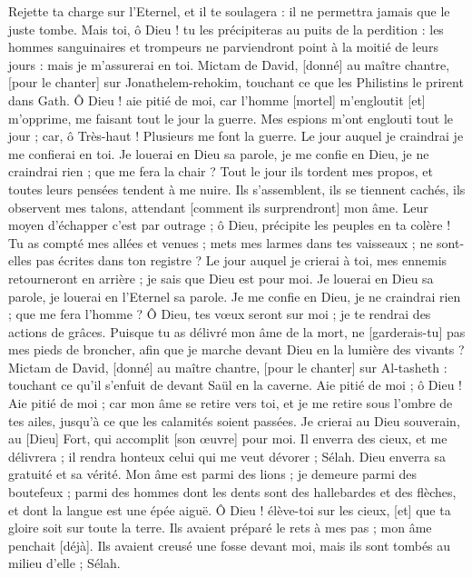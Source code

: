 \begin{multicols}{2}
Rejette ta charge sur l'Eternel, et il te soulagera : il ne permettra jamais que le juste tombe.
Mais toi, ô Dieu ! tu les précipiteras au puits de la perdition : les hommes sanguinaires et trompeurs ne parviendront point à la moitié de leurs jours : mais je m'assurerai en toi.
\VerseOne{}Mictam de David, [donné] au maître chantre, [pour le chanter] sur Jonathelem-rehokim, touchant ce que les Philistins le prirent dans Gath. Ô Dieu ! aie pitié de moi, car l'homme [mortel] m'engloutit [et] m'opprime, me faisant tout le jour la guerre.
Mes espions m'ont englouti tout le jour ; car, ô Très-haut ! Plusieurs me font la guerre.
Le jour auquel je craindrai je me confierai en toi.
Je louerai en Dieu sa parole, je me confie en Dieu, je ne craindrai rien ; que me fera la chair ?
Tout le jour ils tordent mes propos, et toutes leurs pensées tendent à me nuire.
Ils s'assemblent, ils se tiennent cachés, ils observent mes talons, attendant [comment ils surprendront] mon âme.
Leur moyen d'échapper c'est par outrage ; ô Dieu, précipite les peuples en ta colère !
Tu as compté mes allées et venues ; mets mes larmes dans tes vaisseaux ; ne sont-elles pas écrites dans ton registre ?
Le jour auquel je crierai à toi, mes ennemis retourneront en arrière ; je sais que Dieu est pour moi.
Je louerai en Dieu sa parole, je louerai en l'Eternel sa parole.
Je me confie en Dieu, je ne craindrai rien ; que me fera l'homme ?
Ô Dieu, tes vœux seront sur moi ; je te rendrai des actions de grâces.
Puisque tu as délivré mon âme de la mort, ne [garderais-tu] pas mes pieds de broncher, afin que je marche devant Dieu en la lumière des vivants ?
\VerseOne{}Mictam de David, [donné] au maître chantre, [pour le chanter] sur Al-tasheth : touchant ce qu'il s'enfuit de devant Saül en la caverne. Aie pitié de moi ; ô Dieu ! Aie pitié de moi ; car mon âme se retire vers toi, et je me retire sous l'ombre de tes ailes, jusqu'à ce que les calamités soient passées.
Je crierai au Dieu souverain, au [Dieu] Fort, qui accomplit [son œuvre] pour moi.
Il enverra des cieux, et me délivrera ; il rendra honteux celui qui me veut dévorer ; Sélah. Dieu enverra sa gratuité et sa vérité.
Mon âme est parmi des lions ; je demeure parmi des boutefeux ; parmi des hommes dont les dents sont des hallebardes et des flèches, et dont la langue est une épée aiguë.
Ô Dieu ! élève-toi sur les cieux, [et] que ta gloire soit sur toute la terre.
Ils avaient préparé le rets à mes pas ; mon âme penchait [déjà]. Ils avaient creusé une fosse devant moi, mais ils sont tombés au milieu d'elle ; Sélah.

\end{multicols}

